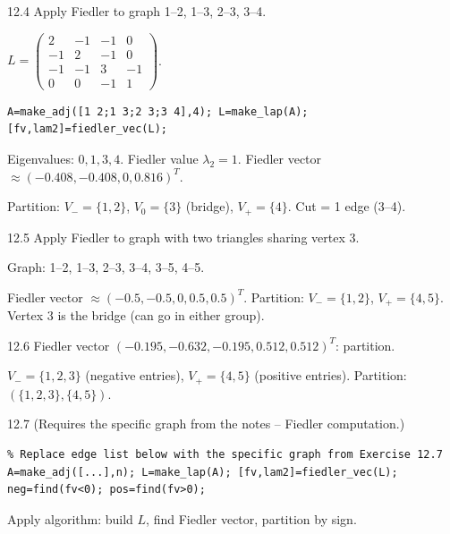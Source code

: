 \begin{exercise}{12.4}
Apply Fiedler to graph 1--2, 1--3, 2--3, 3--4.
\end{exercise}
\begin{solution}
$L=\begin{pmatrix}2&-1&-1&0\\-1&2&-1&0\\-1&-1&3&-1\\0&0&-1&1\end{pmatrix}$.
\begin{lstlisting}
A=make_adj([1 2;1 3;2 3;3 4],4); L=make_lap(A);
[fv,lam2]=fiedler_vec(L);
\end{lstlisting}
Eigenvalues: $0,1,3,4$. Fiedler value $\lambda_2=1$. Fiedler vector $\approx(-0.408,-0.408,0,0.816)^T$.

Partition: $V_-=\{1,2\}$, $V_0=\{3\}$ (bridge), $V_+=\{4\}$. Cut = 1 edge (3--4).
\end{solution}

\begin{exercise}{12.5}
Apply Fiedler to graph with two triangles sharing vertex 3.
\end{exercise}
\begin{solution}
Graph: 1--2, 1--3, 2--3, 3--4, 3--5, 4--5.

Fiedler vector $\approx(-0.5,-0.5,0,0.5,0.5)^T$. Partition: $V_-=\{1,2\}$, $V_+=\{4,5\}$. Vertex 3 is the bridge (can go in either group).
\end{solution}

\begin{exercise}{12.6}
Fiedler vector $(-0.195,-0.632,-0.195,0.512,0.512)^T$: partition.
\end{exercise}
\begin{solution}
$V_-=\{1,2,3\}$ (negative entries), $V_+=\{4,5\}$ (positive entries). Partition: $(\{1,2,3\},\{4,5\})$.
\end{solution}

\begin{exercise}{12.7}
(Requires the specific graph from the notes -- Fiedler computation.)
\end{exercise}
\begin{solution}
\begin{lstlisting}
% Replace edge list below with the specific graph from Exercise 12.7
A=make_adj([...],n); L=make_lap(A); [fv,lam2]=fiedler_vec(L);
neg=find(fv<0); pos=find(fv>0);
\end{lstlisting}
Apply algorithm: build $L$, find Fiedler vector, partition by sign.
\end{solution}

